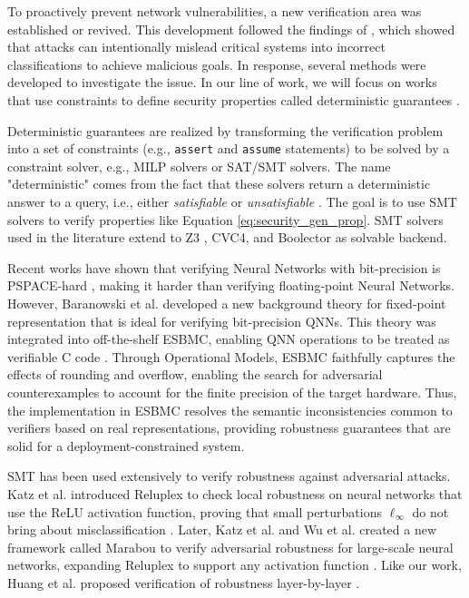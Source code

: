 To proactively prevent network vulnerabilities, a new verification area was established or revived. This development followed the findings of \cite{gorslineAdversarialRobustnessQuantized2021, kurakin2017adversarialmachinelearningscale}, which showed that attacks can intentionally mislead critical systems into incorrect classifications to achieve malicious goals. In response, several methods were developed to investigate the issue. In our line of work, we will focus on works that use constraints to define security properties called deterministic guarantees \cite{gholami2021surveyquantizationmethodsefficient}.

{Deterministic} guarantees are realized by transforming the verification problem into a set of constraints (e.g., \texttt{assert} and \texttt{assume} statements) to be solved by a constraint solver, e.g., MILP solvers or SAT/SMT solvers. The name "deterministic" comes from the fact that these solvers return a deterministic answer to a query, i.e., either \textit{satisfiable} or \textit{unsatisfiable} \cite{gholami2021surveyquantizationmethodsefficient}. The goal is to use SMT solvers to verify properties like Equation \ref{eq:security_gen_prop}. SMT solvers used in the literature extend to Z3 , CVC4, and Boolector \cite{de2008z3, barrett2011cvc4, brummayer2009boolector} as solvable backend.

Recent works have shown that verifying Neural Networks with bit-precision is PSPACE-hard \cite{henzinger2021scalable}, making it harder than verifying floating-point Neural Networks. However, Baranowski et al. developed a new background theory for fixed-point representation \cite{baranowski2020smt} that is ideal for verifying bit-precision QNNs. This theory was integrated into off-the-shelf ESBMC, enabling QNN operations to be treated as verifiable C code \cite{song2021qnnverifier}. Through Operational Models, ESBMC faithfully captures the effects of rounding and overflow, enabling the search for adversarial counterexamples to account for the finite precision of the target hardware. Thus, the implementation in ESBMC resolves the semantic inconsistencies common to verifiers based on real representations, providing robustness guarantees that are solid for a deployment-constrained system.

SMT has been used extensively to verify robustness against adversarial attacks. Katz et al. introduced Reluplex to check local robustness on neural networks that use the ReLU activation function, proving that small perturbations $\ell_\infty$ do not bring about misclassification \cite{katz2017reluplex}. Later, Katz et al. and Wu et al. created a new framework called Marabou to verify adversarial robustness for large-scale neural networks, expanding Reluplex to support any activation function \cite{katz2017reluplex, katz2019marabou, wuMarabou20Versatile2024}. Like our work, Huang et al. proposed verification of robustness layer-by-layer \cite{huangSafetyVerificationDeep2017}.

